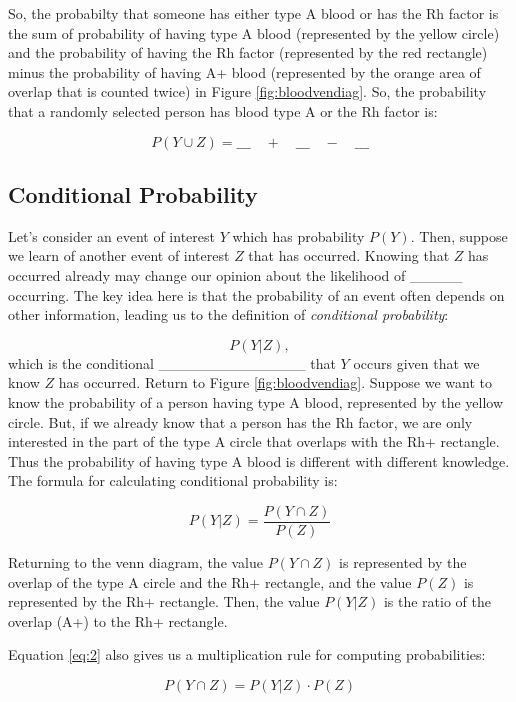 \documentclass[]{book}
\theoremstyle{definition}
\theoremstyle{definition}
\theoremstyle{remark}
\begin{document}
So, the probabilty that someone has either type A blood or has the Rh
factor is the sum of probability of having type A blood (represented by
the yellow circle) and the probability of having the Rh factor
(represented by the red rectangle) minus the probability of having A+
blood (represented by the orange area of overlap that is counted twice)
in Figure \ref{fig:bloodvendiag}. So, the probability that a randomly
selected person has blood type A or the Rh factor is:

\[ P(Y \cup Z) = \_\_\_ \quad + \quad \_\_\_ \quad - \quad \_\_\_\]

\subsection{Conditional Probability}\label{conditional-probability}

Let's consider an event of interest \(Y\) which has probability
\(P(Y)\). Then, suppose we learn of another event of interest \(Z\) that
has occurred. Knowing that \(Z\) has occurred already may change our
opinion about the likelihood of \_\_\_\_\_ occurring. The key idea here
is that the probability of an event often depends on other information,
leading us to the definition of \emph{conditional probability}:

\[ P(Y|Z), \] which is the conditional \_\_\_\_\_\_\_\_\_\_\_\_\_\_ that
\(Y\) occurs given that we know \(Z\) has occurred. Return to Figure
\ref{fig:bloodvendiag}. Suppose we want to know the probability of a
person having type A blood, represented by the yellow circle. But, if we
already know that a person has the Rh factor, we are only interested in
the part of the type A circle that overlaps with the Rh+ rectangle. Thus
the probability of having type A blood is different with different
knowledge. The formula for calculating conditional probability is:

\begin{equation}\label{eq:2}
P(Y|Z) = \frac{P(Y\cap Z)}{P(Z)}
\end{equation}

Returning to the venn diagram, the value \(P(Y \cap Z)\) is represented
by the overlap of the type A circle and the Rh+ rectangle, and the value
\(P(Z)\) is represented by the Rh+ rectangle. Then, the value \(P(Y|Z)\)
is the ratio of the overlap (A+) to the Rh+ rectangle.

Equation \ref{eq:2} also gives us a multiplication rule for computing
probabilities:

\begin{equation}\label{eq:3}
P(Y\cap Z) = P(Y|Z) \cdot P(Z)
\end{equation}
\end{document}
